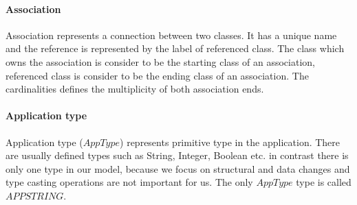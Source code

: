 \documentclass[runningheads]{comsis}
\begin{document}
\paragraph {Association} Association represents a connection between two classes. It has a unique name and the reference is represented by the label of referenced class. The class which owns the association is consider to be the starting class of an association, referenced class is consider to be the ending class of an association. The cardinalities defines the multiplicity of both association ends.


\paragraph{Application type} Application type ($AppType$) represents primitive type in the application. There are usually defined types such as String, Integer, Boolean etc. in contrast there is only one type in our model, because we focus on structural and data changes and type casting operations are not important for us. The only $AppType$ type is called $APPSTRING$.

\end{document}
